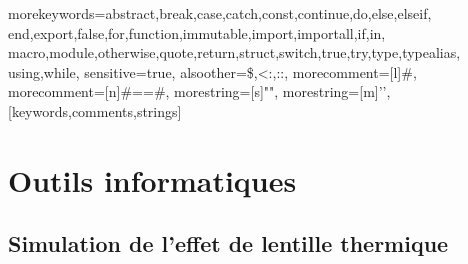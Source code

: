 
%
  {morekeywords={abstract,break,case,catch,const,continue,do,else,elseif,%
      end,export,false,for,function,immutable,import,importall,if,in,%
      macro,module,otherwise,quote,return,struct,switch,true,try,type,typealias,%
      using,while},%
   sensitive=true,%
   alsoother={\$,<:,::},%
   morecomment=[l]\#,%
   morecomment=[n]{\#=}{=\#},%
   morestring=[s]{"}{"},%
   morestring=[m]{'}{'},%
}[keywords,comments,strings]%

\lstset{%
    breaklines          = true, %
    showstringspaces    = false,%
    basicstyle          = \ttfamily\small,
    inputencoding=utf8,
    extendedchars=true,
    frame               = leftline,%
    basewidth           = 0.45em,%
}
\newcommand\matlabstyle{\lstset{%
    language=Matlab,%
    keywordstyle=\color{blue},%
    stringstyle=\color{mylilas},%
    commentstyle=\color{mygreen},%
    numberstyle={\small \color{black}},%
    numbersep=10pt, %
    emph=[1]{classdef, for,end,break},emphstyle=[1]\color{red},%
}}
\newcommand\pythonstyle{\lstset{%
    language=Python,%
    keywordstyle=\color{deepblue},%
    stringstyle=\color{deepgreen},%
    commentstyle=\color{lightgray},%
    otherkeywords={self},
}}
\newcommand\juliastyle{\lstset{%
    language         = Julia,
    keywordstyle     = \bfseries\color{blue},
    stringstyle      = \color{magenta},
    commentstyle     = \color{ForestGreen},
}}







\chapter{Outils informatiques}\label{AppA}

\section{Simulation de l'effet de lentille thermique}\label{APPsimuthermallens}


